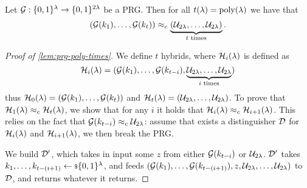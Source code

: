 \begin{lemma} \label{lem:prg-poly-times}
	Let $\mathcal{G} : \{0,1\}^{\lambda} \to \{0,1\}^{2\lambda}$ be a \ac{PRG}.
	Then for all $t(\lambda) = \mathrm{poly}(\lambda)$ we have that
	\begin{equation*}
		\left( \mathcal{G}(k_1), \dots, \mathcal{G}(k_t) \right)
		\approx_c
		\underbrace{\left( \mathcal{U}_{2\lambda}, \dots, \mathcal{U}_{2\lambda} \right)}_{t \text{ times}}. \qedhere
	\end{equation*}
\end{lemma}

\begin{proof}[Proof of \cref{lem:prg-poly-times}]
	We define $t$ hybrids, where $\mathcal{H}_i(\lambda)$ is defined as
	\begin{equation*}
		\mathcal{H}_i(\lambda) = ( \mathcal{G}(k_1), \dots, \mathcal{G}(k_{t-i}), \underbrace{\mathcal{U}_{2\lambda}, \dots, \mathcal{U}_{2\lambda}}_{i \text{ times}} )
	\end{equation*}
	thus $\mathcal{H}_0(\lambda) = (\mathcal{G}(k_1), \dots, \mathcal{G}(k_t))$ and $\mathcal{H}_t(\lambda) = (\mathcal{U}_{2\lambda}, \dots, \mathcal{U}_{2\lambda})$.
	To prove that $\mathcal{H}_1(\lambda) \approx_c \mathcal{H}_t(\lambda)$, we show that for any $i$ it holds that $\mathcal{H}_i(\lambda) \approx_c \mathcal{H}_{i+1}(\lambda)$.
	This relies on the fact that $\mathcal{G}(k_{t-i}) \approx_c \mathcal{U}_{2\lambda}$: assume that exists a distinguisher $\mathcal{D}$ for $\mathcal{H}_{i}(\lambda)$ and $\mathcal{H}_{i+1}(\lambda)$, we then break the \ac{PRG}.

	We build $\mathcal{D}'$, which takes in input some $z$ from either $\mathcal{G}(k_{t-i})$ or $\mathcal{U}_{2\lambda}$.
	$\mathcal{D}'$ takes $k_1, \dots, k_{t-(i+1)} \leftarrow {\scriptstyle \$} {\{0,1\}^{\lambda}}$, and feeds $(\mathcal{G}(k_1), \dots, \mathcal{G}(k_{t-(i+1)}), z, \mathcal{U}_{2\lambda}, \dots, \mathcal{U}_{2\lambda})$ to $\mathcal{D}$, and returns whatever it returns.
\end{proof}

